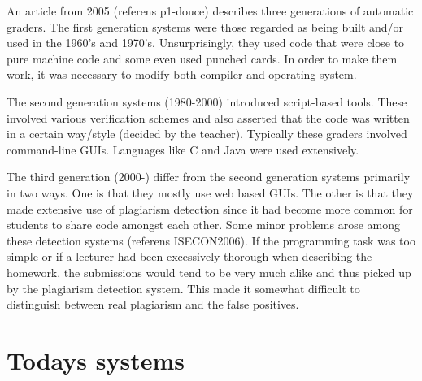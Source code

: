An article from 2005 (referens p1-douce) describes three generations of automatic graders. The first generation systems were those regarded as being built and/or used in the 1960's and 1970's. Unsurprisingly, they used code that were close to pure machine code and some even used punched cards. In order to make them work, it was necessary to modify both compiler and operating system. 

The second generation systems (1980-2000) introduced script-based tools. These involved various verification schemes and also asserted that the code was written in a certain way/style (decided by the teacher). Typically these graders involved command-line GUIs. Languages like C and Java were used extensively.

The third generation (2000-) differ from the second generation systems primarily in two ways. One is that they mostly use web based GUIs. The other is that they made extensive use of plagiarism detection since it had become more common for students to share code amongst each other. Some minor problems arose among these detection systems (referens ISECON2006). If the programming task was too simple or if a lecturer had been excessively thorough when describing the homework, the submissions would tend to be very much alike and thus picked up by the plagiarism detection system. This made it somewhat difficult to distinguish between real plagiarism and the false positives. 


\section{Todays systems}
